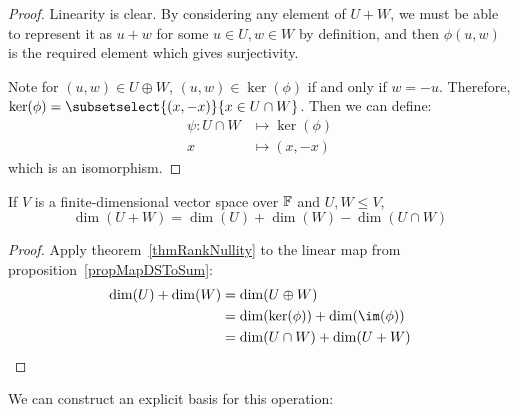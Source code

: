 \documentclass[../Main.tex]{subfiles}
\begin{document}
\begin{proof}
    Linearity is clear. By considering any element of $U + W$, we must be able to represent it as $u + w$ for some $u \in U, w \in W$ by definition, and then $\phi(u, w)$ is the required element which gives surjectivity.

    Note for $(u, w) \in U \oplus W$, $(u, w) \in \ker(\phi)$ if and only if $w = -u$. Therefore, $\ker(\phi) = \subsetselect{(x, -x)}{x \in U \cap W}$. Then we can define:
    \begin{align*}
        \psi : U \cap W &\mapsto \ker(\phi)\\
        x &\mapsto (x, -x)
    \end{align*}
    which is an isomorphism.
\end{proof}
\begin{corollary}
    If $V$ is a finite-dimensional vector space over $\mathbb{F}$ and $U, W \leq V$,
    \begin{equation*}
        \dim(U + W) = \dim(U) + \dim(W) - \dim(U \cap W)
    \end{equation*}
    \label{corSumIntersection}
\end{corollary}
\begin{proof}
    Apply theorem~\ref{thmRankNullity} to the linear map from proposition~\ref{propMapDSToSum}:
    \begin{align}
        \dim(U) + \dim(W) &= \dim(U \oplus W) \\
        &= \dim(\ker(\phi)) + \dim(\im(\phi)) \\
        &= \dim(U \cap W) + \dim(U + W)
    \end{align}
\end{proof}
We can construct an explicit basis for this operation:
\end{document}
